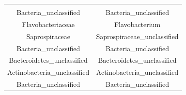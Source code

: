 \documentclass[]{article}
\begin{document}
\begin{longtable}[]{@{}cc@{}}
\begin{minipage}[t]{0.43\columnwidth}
\end{minipage}\tabularnewline
\begin{minipage}[t]{0.41\columnwidth}\centering\strut
Bacteria\_unclassified\strut
\end{minipage} & \begin{minipage}[t]{0.43\columnwidth}\centering\strut
Bacteria\_unclassified\strut
\end{minipage}\tabularnewline
\begin{minipage}[t]{0.41\columnwidth}\centering\strut
Flavobacteriaceae\strut
\end{minipage} & \begin{minipage}[t]{0.43\columnwidth}\centering\strut
Flavobacterium\strut
\end{minipage}\tabularnewline
\begin{minipage}[t]{0.41\columnwidth}\centering\strut
Saprospiraceae\strut
\end{minipage} & \begin{minipage}[t]{0.43\columnwidth}\centering\strut
Saprospiraceae\_unclassified\strut
\end{minipage}\tabularnewline
\begin{minipage}[t]{0.41\columnwidth}\centering\strut
Bacteria\_unclassified\strut
\end{minipage} & \begin{minipage}[t]{0.43\columnwidth}\centering\strut
Bacteria\_unclassified\strut
\end{minipage}\tabularnewline
\begin{minipage}[t]{0.41\columnwidth}\centering\strut
Bacteroidetes\_unclassified\strut
\end{minipage} & \begin{minipage}[t]{0.43\columnwidth}\centering\strut
Bacteroidetes\_unclassified\strut
\end{minipage}\tabularnewline
\begin{minipage}[t]{0.41\columnwidth}\centering\strut
Actinobacteria\_unclassified\strut
\end{minipage} & \begin{minipage}[t]{0.43\columnwidth}\centering\strut
Actinobacteria\_unclassified\strut
\end{minipage}\tabularnewline
\begin{minipage}[t]{0.41\columnwidth}\centering\strut
Bacteria\_unclassified\strut
\end{minipage} & \begin{minipage}[t]{0.43\columnwidth}\centering\strut
Bacteria\_unclassified\strut

\end{minipage}
\end{longtable}
\end{document}
